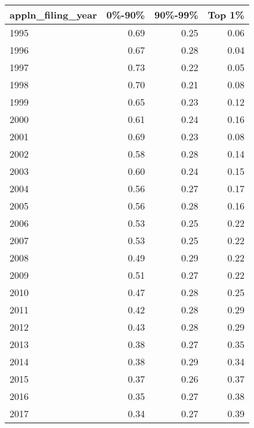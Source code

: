 \begin{table}[ht]
\centering
\begin{tabular}{lrrr}
  \hline
appln\_filing\_year & 0\%-90\% & 90\%-99\% & Top 1\% \\ 
  \hline
1995 & 0.69 & 0.25 & 0.06 \\ 
  1996 & 0.67 & 0.28 & 0.04 \\ 
  1997 & 0.73 & 0.22 & 0.05 \\ 
  1998 & 0.70 & 0.21 & 0.08 \\ 
  1999 & 0.65 & 0.23 & 0.12 \\ 
  2000 & 0.61 & 0.24 & 0.16 \\ 
  2001 & 0.69 & 0.23 & 0.08 \\ 
  2002 & 0.58 & 0.28 & 0.14 \\ 
  2003 & 0.60 & 0.24 & 0.15 \\ 
  2004 & 0.56 & 0.27 & 0.17 \\ 
  2005 & 0.56 & 0.28 & 0.16 \\ 
  2006 & 0.53 & 0.25 & 0.22 \\ 
  2007 & 0.53 & 0.25 & 0.22 \\ 
  2008 & 0.49 & 0.29 & 0.22 \\ 
  2009 & 0.51 & 0.27 & 0.22 \\ 
  2010 & 0.47 & 0.28 & 0.25 \\ 
  2011 & 0.42 & 0.28 & 0.29 \\ 
  2012 & 0.43 & 0.28 & 0.29 \\ 
  2013 & 0.38 & 0.27 & 0.35 \\ 
  2014 & 0.38 & 0.29 & 0.34 \\ 
  2015 & 0.37 & 0.26 & 0.37 \\ 
  2016 & 0.35 & 0.27 & 0.38 \\ 
  2017 & 0.34 & 0.27 & 0.39 \\ 
   \hline
\end{tabular}
\end{table}
